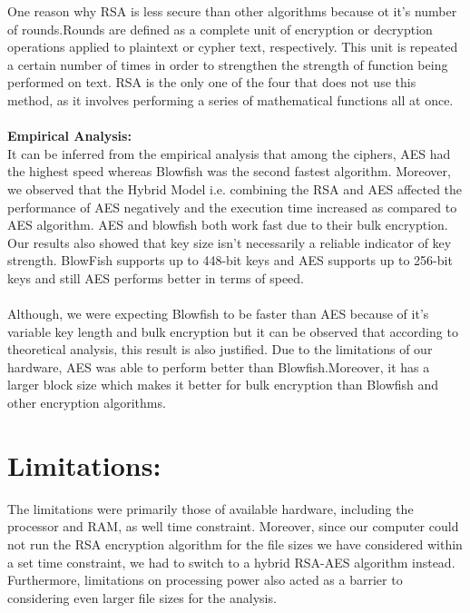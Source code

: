 \documentclass[a4paper]{report} %
\begin{document}
One reason why RSA is less secure than other algorithms because ot it's number of rounds.Rounds are defined as a complete unit of encryption or decryption operations applied to plaintext or cypher text, respectively. This unit is repeated a certain number of times in order to strengthen the strength of function being performed on text. RSA is the only one of the four that does not use this method, as it involves performing a series of mathematical functions all at once. \\ \\ 
\textbf{Empirical Analysis:}\\
It can be inferred from the empirical analysis that among the  ciphers, AES had the highest speed whereas Blowfish was the second fastest algorithm. Moreover, we observed that the Hybrid Model i.e. combining the RSA and AES affected the performance of AES negatively and the execution time increased as compared to AES algorithm. AES and blowfish both work fast due to their bulk encryption. 
Our results also showed that key size isn't necessarily a reliable indicator of key strength. BlowFish  supports up to 448-bit keys and AES supports up to 256-bit keys and still AES performs better in terms of speed.\\ \\
Although, we were expecting Blowfish to be faster than AES because of it's variable key length and bulk encryption but it can be observed that according to theoretical analysis, this result is also justified. Due to the limitations of our hardware, AES was able to perform better than Blowfish.Moreover, it has a larger block size which makes it better for bulk encryption than Blowfish and other encryption algorithms.


\section{Limitations:}
The limitations were primarily those of available hardware, including the processor and RAM, as well time constraint. Moreover, since our computer could not run the RSA encryption algorithm for the file sizes we have considered within a set time constraint, we had to switch to a hybrid RSA-AES algorithm instead. Furthermore, limitations on processing power also acted as a barrier to considering even larger file sizes for the analysis. 
\end{document}
